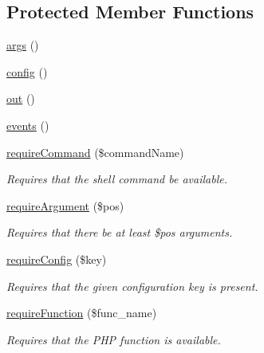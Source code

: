 \subsection*{Protected Member Functions}
\begin{DoxyCompactItemize}
\item 
\hyperlink{classGenericCommand_a2b5ffbef597bcac2bb27fb9fe9ceb996}{args} ()
\item 
\hyperlink{classGenericCommand_a806e73ae27fe8187419963c1839531b4}{config} ()
\item 
\hyperlink{classGenericCommand_a08478bb9a4cce51c5eec24b4dab17cc8}{out} ()
\item 
\hyperlink{classGenericCommand_ac45bd478789164f7c5fc219ead8cf9d2}{events} ()
\item 
\hyperlink{classGenericCommand_a7153033aa09664492cfb43ed990fd763}{require\-Command} (\$command\-Name)
\begin{DoxyCompactList}\small\item\em Requires that the shell command be available. \end{DoxyCompactList}\item 
\hyperlink{classGenericCommand_a5707289b6d0b2d8afd0bc63a82e99ad1}{require\-Argument} (\$pos)
\begin{DoxyCompactList}\small\item\em Requires that there be at least \$pos arguments. \end{DoxyCompactList}\item 
\hyperlink{classGenericCommand_a5161604bad2812fb55f62f5258dd4830}{require\-Config} (\$key)
\begin{DoxyCompactList}\small\item\em Requires that the given configuration key is present. \end{DoxyCompactList}\item 
\hyperlink{classGenericCommand_adc40591203a5344603b7365f12829cd8}{require\-Function} (\$func\-\_\-name)
\begin{DoxyCompactList}\small\item\em Requires that the P\-H\-P function is available. \end{DoxyCompactList}\end{DoxyCompactItemize}


